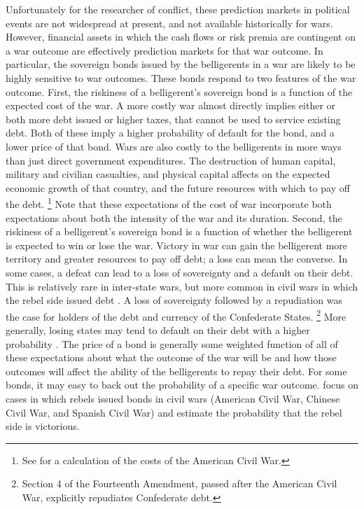 Unfortunately for the researcher of conflict, these prediction markets in political events are not widespread at present, and not available historically for wars.
However, financial assets in which the cash flows or risk premia are contingent on a war outcome are effectively prediction markets for that war outcome.
In particular, the sovereign bonds issued by the belligerents in a war are likely to be highly sensitive to war outcomes.
These bonds respond to two features of the war outcome.
First, the riskiness of a belligerent's sovereign bond is a function of the expected cost of the war.
A more costly war almost directly implies either or both more debt issued or higher taxes, that cannot be used to service existing debt.
Both of these imply a higher probability of default for the bond, and a lower price of that bond.
Wars are also costly to the belligerents in more ways than just direct government expenditures.
The destruction of human capital, military and civilian casualties, and physical capital affects on the expected economic growth of that country, and the future resources with which to pay off the debt.%
\footnote{See \textcite{GoldinLewis1975} for a calculation of the costs of the American Civil War.}
Note that these expectations of the cost of war incorporate both expectations about both the intensity of the war and its duration.
Second, the riskiness of a belligerent's sovereign bond is a function of whether the belligerent is expected to win or lose the war.
Victory in war can gain the belligerent more territory and greater resources to pay off debt; a loss can mean the converse.
In some cases, a defeat can lead to a loss of sovereignty and a default on their debt.
This is relatively rare in inter-state wars, but more common in civil wars in which the rebel side issued debt \parencite{HaberMitchenerOosterlinckEtAl2015}.
A loss of sovereignty followed by a repudiation was the case for holders of the debt and currency of the Confederate States.%
\footnote{Section 4 of the Fourteenth Amendment, passed after the American Civil War, explicitly repudiates Confederate debt.}
More generally, losing states may tend to default on their debt with a higher probability \parencite{Slantchev2012a}.
The price of a bond is generally some weighted function of all of these expectations about what the outcome of the war will be and how those outcomes will affect the ability of the belligerents to repay their debt.
For some bonds, it may easy to back out the probability of a specific war outcome.
\textcite{HaberMitchenerOosterlinckEtAl2015} focus on cases in which rebels issued bonds in civil wars (American Civil War, Chinese Civil War, and Spanish Civil War) and estimate the probability that the rebel side is victorious.
